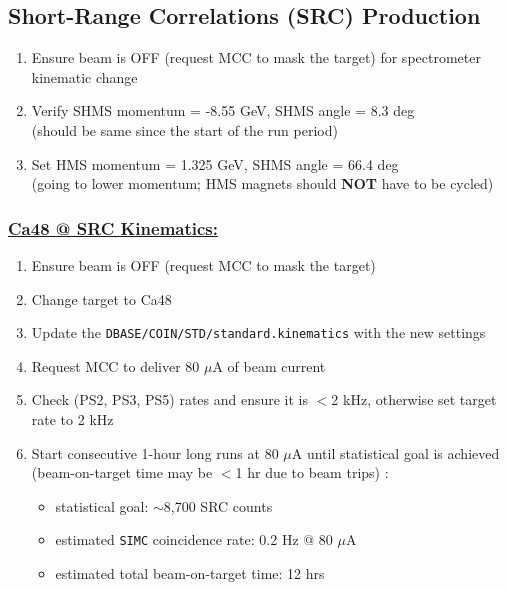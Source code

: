 \documentclass{article}
\begin{document}
\subsection{Short-Range Correlations (SRC) Production}
\begin{enumerate}
    \item Ensure beam is OFF (request MCC to mask the target) for spectrometer kinematic change
    \item Verify SHMS momentum = -8.55 GeV, SHMS angle = 8.3 deg \\ (should be same since the start of the run period)
    \item Set HMS momentum = 1.325 GeV, SHMS angle = 66.4 deg \\(going to lower momentum; HMS magnets should \textbf{NOT} have to be cycled)
\end{enumerate}

\subsubsection*{\underline{Ca48 @ SRC Kinematics:}}
\begin{enumerate}
\item Ensure beam is OFF (request MCC to mask the target)
\item Change target to Ca48
\item Update the \texttt{DBASE/COIN/STD/standard.kinematics} with the new settings
\item Request MCC to deliver 80 $\mu$A of beam current
\item Check (PS2, PS3, PS5) rates and ensure it is $<$2 kHz, otherwise set target rate to 2 kHz
\item Start consecutive 1-hour long runs at 80 $\mu$A until statistical goal is achieved \\ (beam-on-target time may be $<$1 hr due to beam trips) :
\begin{itemize}
    \item statistical goal: $\sim$8,700 SRC counts
    \item estimated \texttt{SIMC} coincidence rate: 0.2 Hz @ 80 $\mu$A
    \item estimated total beam-on-target time: 12 hrs
\end{itemize}
\end{enumerate}
\end{document}
